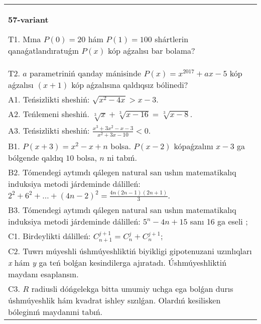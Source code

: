 \documentclass{article}
\begin{document}
\begin{tabular}{m{17cm}}
\textbf{57-variant}
\newline

T1. Mına \(P(0) = 20\) hám \(P(1) = 100\) shártlerin qanaǵatlandıratuǵın \(P(x)\) kóp aǵzalısı bar bolama? \\
T2. \(a\) parametriniń qanday mánisinde \(P(x) = x^{2017} + ax - 5\) kóp aǵzalısı \((x + 1)\) kóp aǵzalısına qaldıqsız bólinedi? \\
A1. Teńsizlikti sheshiń: \(\sqrt{x^{2} - 4x} > x - 3\). \\
A2. Teńlemeni sheshiń. \(\sqrt[3]{x} + \sqrt[3]{x - 16} = \sqrt[3]{x - 8}\). \\
A3. Teńsizlikti sheshiń: \(\frac{x^{3} + 3x^{2} - x - 3}{x^{2} + 3x - 10} < 0\). \\
B1. \(P(x + 3) = x^{2} - x + n\) bolsa. \(P(x - 2)\) kópaǵzalını \(x - 3\) ga bólgende qaldıq \(10\) bolsa, \(n\) ni tabıń. \\
B2. Tómendegi aytımdı qálegen natural san ushın matematikalıq induksiya metodi járdeminde dálilleń: \(2^{2} + 6^{2} + \ldots + (4n - 2)^{2} = \frac{4n(2n - 1)(2n + 1)}{3}\). \\
B3. Tómendegi aytımdı qálegen natural san ushın matematikalıq induksiya metodi járdeminde dálilleń: \(5^{n} - 4n + 15\) sanı 16 ga eseli ; \\
C1. Birdeylikti dálilleń: \(C_{n + 1}^{j + 1} = C_{n}^{j} + C_{n}^{j + 1}\); \\
C2. Tuwrı múyeshli úshmúyeshliktiń biyikligi gipotenuzani uzınlıqları \emph{x} hám \emph{y} ga teń bolǵan kesindilerga ajıratadı. Úshmúyeshliktiń maydanı esaplansın. \\
C3. \(R\) radiusli dóńgelekga bitta umumiy uchga ega bolǵan durıs úshmúyeshlik hám kvadrat ishley sızılǵan. Olardıń kesilisken bóleginıń maydanıni tabıń. \\

\end{tabular}
\vspace{1cm}
\end{document}
